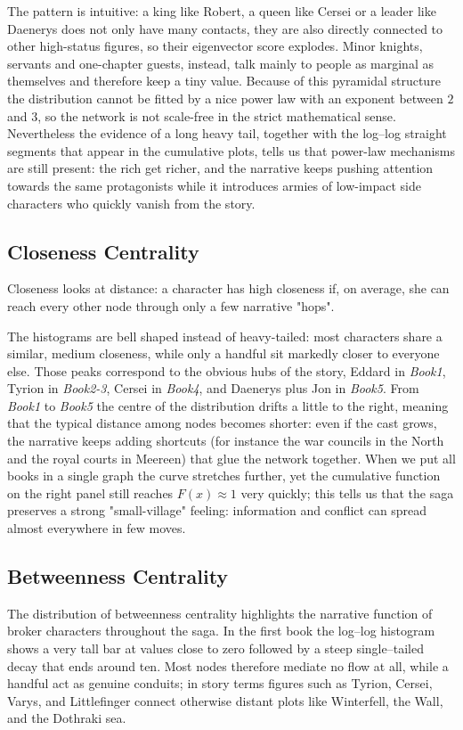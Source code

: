 \documentclass[12pt, a4paper]{article}
\begin{document}
The pattern is intuitive: a king like Robert, a queen like Cersei or a leader like Daenerys does not only have many contacts, they are also directly connected to other high-status figures, so their eigenvector score explodes.  Minor knights, servants and one-chapter guests, instead, talk mainly to people as marginal as themselves and therefore keep a tiny value.  Because of this pyramidal structure the distribution cannot be fitted by a nice power law with an exponent between $2$ and $3$, so the network is not scale-free in the strict mathematical sense.  Nevertheless the evidence of a long heavy tail, together with the log–log straight segments that appear in the cumulative plots, tells us that power-law mechanisms are still present: the rich get richer, and the narrative keeps pushing attention towards the same protagonists while it introduces armies of low-impact side characters who quickly vanish from the story.

\subsection*{Closeness Centrality}
Closeness looks at distance: a character has high closeness if,
on average, she can reach every other node through only a few narrative "hops".


The histograms are bell shaped instead of heavy-tailed: most characters share a similar, medium closeness, while only a handful sit markedly closer to everyone else.  Those peaks correspond to the obvious hubs of the story, Eddard in \emph{Book1}, Tyrion in \emph{Book2-3}, Cersei in \emph{Book4}, and Daenerys plus Jon in \emph{Book5}.
From \emph{Book1} to \emph{Book5} the centre of the distribution drifts a little to the right, meaning that the typical distance among nodes becomes shorter: even if the cast grows, the narrative keeps adding shortcuts (for instance the war councils in the North and the royal courts in Meereen) that glue the network together.
When we put all books in a single graph the curve stretches further, 
yet the cumulative function on the right panel still reaches $F(x)\approx1$ 
very quickly; this tells us that the saga preserves a strong "small-village" feeling: 
information and conflict can spread almost everywhere in  few moves.

\subsection*{Betweenness Centrality}
The distribution of betweenness centrality highlights the narrative function of broker characters throughout the saga. In the first book the log–log histogram shows a very tall bar at values close to zero followed by a steep single–tailed decay that ends around ten. Most nodes therefore mediate no flow at all, while a handful act as genuine conduits; in story terms figures such as Tyrion, Cersei, Varys, and Littlefinger connect otherwise distant plots like Winterfell, the Wall, and the Dothraki sea.
\end{document}
